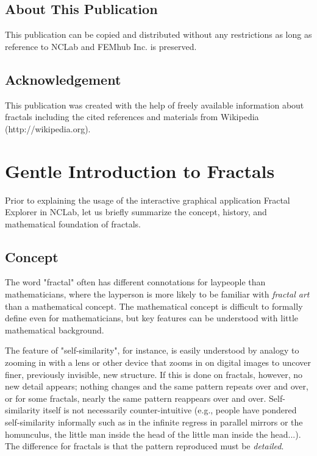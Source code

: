 \documentclass[article,A4,12pt]{llncs}
\begin{document}
\subsection*{About This Publication}
This publication can be copied and distributed without any restrictions
as long as reference to NCLab and FEMhub Inc. is preserved.

\subsection*{Acknowledgement}
This publication was created with the help of freely available information about fractals
including the cited references and materials from Wikipedia (http://wikipedia.org).

\normalsize

\newpage

\pagestyle{plain}
\setcounter{page}{1}

\section*{Gentle Introduction to Fractals}

Prior to explaining the usage of the interactive graphical application 
Fractal Explorer in NCLab, let us briefly summarize the concept, history, 
and mathematical foundation of fractals.

\subsection*{Concept}

The word "fractal" often has different connotations for laypeople than mathematicians, where 
the layperson is more likely to be familiar with {\em fractal art} than a mathematical concept. 
The mathematical concept is difficult to formally define even for mathematicians, but key 
features can be understood with little mathematical background.

The feature of "self-similarity", for instance, is easily understood by analogy to zooming in 
with a lens or other device that zooms in on digital images to uncover finer, previously 
invisible, new structure. If this is done on fractals, however, no new detail appears; 
nothing changes and the same pattern repeats over and over, or for some fractals, nearly 
the same pattern reappears over and over. Self-similarity itself is not necessarily counter-intuitive 
(e.g., people have pondered self-similarity informally such as in the infinite regress in 
parallel mirrors or the homunculus, the little man inside the head of the little man inside 
the head...). The difference for fractals is that the pattern reproduced must be {\em detailed}.
\end{document}
